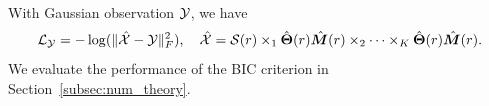 \documentclass[lettersize,onecolumn,journal]{IEEEtran}
\theoremstyle{definition}
\theoremstyle{definition}
\begin{document}
{With Gaussian observation $\mathcal{Y}$, we have
\begin{equation}
    \mathcal{L}_{\mathcal{Y}} = - \log(\lVert\hat {\mathcal{X}} - \mathcal{Y}\rVert_F^2), \quad \hat {\mathcal{X}} = \mathcal{S}(r) \times_1 \hat {\boldsymbol{\Theta}}(r) \hat {\bm M}(r) \times_2 \cdots \times_K \hat {\boldsymbol{\Theta}}(r) \hat {\bm M}(r).
\end{equation}
We evaluate the performance of the BIC criterion in Section~\ref{subsec:num_theory}.





}




\end{document}
